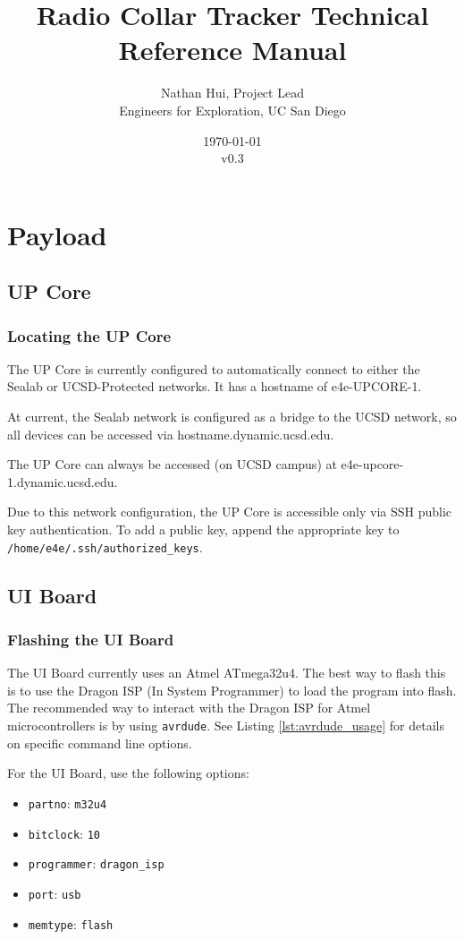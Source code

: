 \documentclass{report}
\title{Radio Collar Tracker Technical Reference Manual}
\author{Nathan Hui, Project Lead\\Engineers for Exploration, UC San Diego}
\date{\today\\v0.3}
\begin{document}
	\maketitle
	\tableofcontents
	\listoffigures
	\listoftables
	\lstlistoflistings
	\chapter{Payload}
		\section{UP Core}
			\subsection{Locating the UP Core}
				The UP Core is currently configured to automatically connect to either the Sealab or UCSD-Protected networks.  It has a hostname of e4e-UPCORE-1.

				At current, the Sealab network is configured as a bridge to the UCSD network, so all devices can be accessed via hostname.dynamic.ucsd.edu.

				The UP Core can always be accessed (on UCSD campus) at e4e-upcore-1.dynamic.ucsd.edu.

				Due to this network configuration, the UP Core is accessible only via SSH public key authentication.  To add a public key, append the appropriate key to \lstinline[language=sh]{/home/e4e/.ssh/authorized_keys}.
		\section{UI Board} \label{sec:ui}
			\subsection{Flashing the UI Board} \label{ssec:flash_ui}
				The UI Board currently uses an Atmel ATmega32u4.  The best way to flash this is to use the Dragon ISP (In System Programmer) to load the program into flash.  The recommended way to interact with the Dragon ISP for Atmel microcontrollers is by using \lstinline[language=sh]{avrdude}.  See Listing \ref{lst:avrdude_usage} for details on specific command line options.

				For the UI Board, use the following options:

				\begin{itemize}
					\item \lstinline{partno}: \lstinline{m32u4}
					\item \lstinline{bitclock}: \lstinline{10}
					\item \lstinline{programmer}: \lstinline{dragon_isp}
					\item \lstinline{port}: \lstinline{usb}
					\item \lstinline{memtype}: \lstinline{flash}
				\end{itemize}
				
\end{document}
